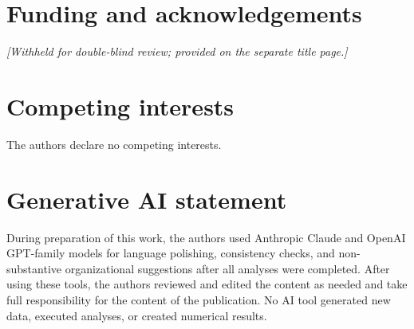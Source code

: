 \documentclass[11pt]{article}
\begin{document}
\section*{Funding and acknowledgements}
\emph{[Withheld for double-blind review; provided on the separate title page.]}

\section*{Competing interests}
The authors declare no competing interests.

\section*{Generative AI statement}
During preparation of this work, the authors used Anthropic Claude and OpenAI GPT-family models for language polishing, consistency checks, and non-substantive organizational suggestions after all analyses were completed. After using these tools, the authors reviewed and edited the content as needed and take full responsibility for the content of the publication. No AI tool generated new data, executed analyses, or created numerical results.
\end{document}

